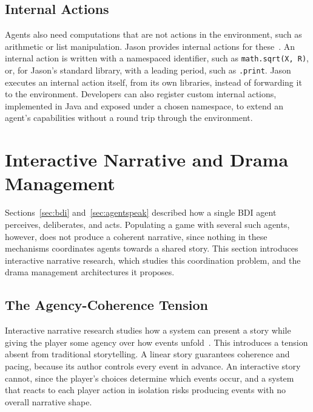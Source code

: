 \subsection{Internal Actions}
\label{sec:jason-internal-actions}
 
Agents also need computations that are not actions in the environment, such as arithmetic or list manipulation. Jason provides internal actions for these~\cite{Bordini2007}. An internal action is written with a namespaced identifier, such as \lstinline|math.sqrt(X, R)|, or, for Jason's standard library, with a leading period, such as \lstinline|.print|. Jason executes an internal action itself, from its own libraries, instead of forwarding it to the environment. Developers can also register custom internal actions, implemented in Java and exposed under a chosen namespace, to extend an agent's capabilities without a round trip through the environment.


\section{Interactive Narrative and Drama Management}
\label{sec:drama-management}
 
Sections~\ref{sec:bdi} and~\ref{sec:agentspeak} described how a single BDI agent perceives, deliberates, and acts. Populating a game with several such agents, however, does not produce a coherent narrative, since nothing in these mechanisms coordinates agents towards a shared story. This section introduces interactive narrative research, which studies this coordination problem, and the drama management architectures it proposes.
 
\subsection{The Agency-Coherence Tension}
\label{sec:agency-coherence}
 
Interactive narrative research studies how a system can present a story while giving the player some agency over how events unfold~\cite{Riedl2013}. This introduces a tension absent from traditional storytelling. A linear story guarantees coherence and pacing, because its author controls every event in advance. An interactive story cannot, since the player's choices determine which events occur, and a system that reacts to each player action in isolation risks producing events with no overall narrative shape.
 
